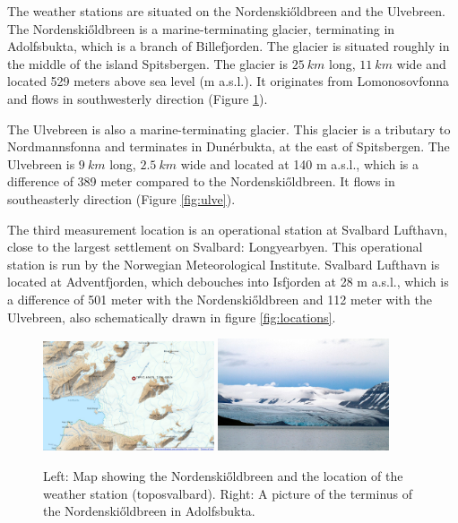 \documentclass[11pt]{report}
\begin{document}
The weather stations are situated on the Nordenski\H{o}ldbreen and the Ulvebreen. The Nordenski\H{o}ldbreen is a marine-terminating glacier, terminating in Adolfsbukta, which is a branch of Billefjorden. The glacier is situated roughly in the middle of the island Spitsbergen. The glacier is $\SI{25}{km}$ long, $\SI{11}{km}$ wide and located 529 meters above sea level (m a.s.l.). It originates from Lomonosovfonna and flows in southwesterly direction (Figure \ref{fig:norden}). 

The Ulvebreen is also a marine-terminating glacier. This glacier is a tributary to Nordmannsfonna and terminates in Dunérbukta, at the east of Spitsbergen. The Ulvebreen is $\SI{9}{km}$ long, $\SI{2.5}{km}$ wide and located at 140 m a.s.l., which is a difference of 389 meter compared to the Nordenski\H{o}ldbreen. It flows in southeasterly direction (Figure \ref{fig:ulve}). 

The third measurement location is an operational station at Svalbard Lufthavn, close to the largest settlement on Svalbard: Longyearbyen. This operational station is run by the Norwegian Meteorological Institute. Svalbard Lufthavn is located at Adventfjorden, which debouches into Isfjorden at 28 m a.s.l., which is a difference of 501 meter with the Nordenski\H{o}ldbreen and 112 meter with the Ulvebreen, also schematically drawn in figure \ref{fig:locations}.

\begin{figure}[h]
\includegraphics[scale=1, width=0.45\textwidth]{nskimap.jpg}
\includegraphics[scale=1, width=0.45\textwidth]{view1.jpg}
\centering{}
\caption{Left: Map showing the Nordenski\H{o}ldbreen and the location of the weather station (toposvalbard). Right: A picture of the terminus of the Nordenski\H{o}ldbreen in Adolfsbukta.}
\label{fig:norden}
\end{figure}
\end{document}
